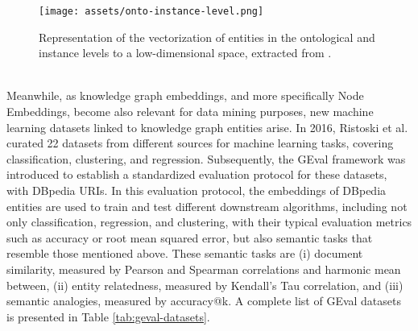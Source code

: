 \documentclass[11pt,titlepage,oneside,openany]{book}
\begin{document}
\begin{figure}[h!]
    \centering
    \centerline{\texttt{[image: assets/onto-instance-level.png]}}
    \vspace*{-3mm}
    \caption{Representation of the vectorization of entities in the ontological and instance levels to a low-dimensional space, extracted from \cite{alshargi_concept2vec_2020}. }
    \label{fig:concept2vec}
\end{figure}
\\
Meanwhile, as knowledge graph embeddings, and more specifically Node Embeddings, become also relevant for data mining purposes, new machine learning datasets linked to knowledge graph entities arise. In 2016, Ristoski et al. \cite{ristoski_collection_2016} curated 22 datasets from different sources for machine learning tasks, covering classification, clustering, and regression. Subsequently, the GEval framework \cite{pellegrino_geval_2020, pellegrino_configurable_2019} was introduced to establish a standardized evaluation protocol for these datasets, with DBpedia URIs. In this evaluation protocol, the embeddings of DBpedia entities are used to train and test different downstream algorithms, including not only classification, regression, and clustering, with their typical evaluation metrics such as accuracy or root mean squared error, but also semantic tasks that resemble those mentioned above. These semantic tasks are (i) document similarity, measured by Pearson and Spearman correlations and harmonic mean between, (ii) entity relatedness, measured by Kendall's Tau correlation, and (iii) semantic analogies, measured by accuracy@k. A complete list of GEval datasets is presented in Table \ref{tab:geval-datasets}.\\
\end{document}
